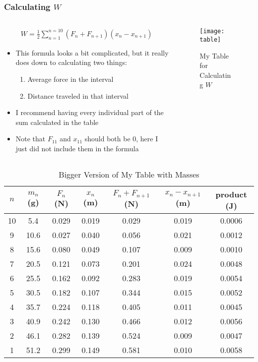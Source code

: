 \documentclass[handout,aspectratio=169]{beamer}
\begin{document}
\begin{frame}
  \frametitle{Calculating $W$}
  \begin{columns}
    \begin{column}{0.6\textwidth}
      {\footnotesize \begin{align*}
        W=\frac12\sum_{n=1}^{n=10}(F_n+F_{n+1})(x_n-x_{n+1})
      \end{align*}}
      \begin{itemize}
      \item This formula looks a bit complicated, but it really does down to calculating two things:
        \begin{enumerate}
        \item Average force in the interval
        \item Distance traveled in that interval
        \end{enumerate}
      \item I recommend having every individual part of the sum calculated in the table 
      \item Note that $F_{11}$ and $x_{11}$ should both be 0, here I just did not include them in the formula
      \end{itemize}
    \end{column}
    \begin{column}{0.4\textwidth}
      \begin{figure}[H]
        \centering
        \texttt{[image: table]}
        \caption{My Table for Calculating $W$}
      \end{figure}
    \end{column}
  \end{columns}
\end{frame}
\begin{frame}
  \begin{table}[H]
    \begin{tabular}{c|c|c|c|c|c|c}
      $n$ & $m_n$ (g) & $F_n$ (N) & $x_n$ (m) & $F_n+F_{n+1}$ (N) & $x_n-x_{n+1}$ (m) & product (J) \\ \hline
      10 & 5.4  & 0.029 & 0.019 & 0.029 & 0.019 & 0.0006 \\
      9  & 10.6 & 0.027 & 0.040 & 0.056 & 0.021 & 0.0012 \\
      8  & 15.6 & 0.080 & 0.049 & 0.107 & 0.009 & 0.0010 \\
      7  & 20.5 & 0.121 & 0.073 & 0.201 & 0.024 & 0.0048 \\
      6  & 25.5 & 0.162 & 0.092 & 0.283 & 0.019 & 0.0054 \\
      5  & 30.5 & 0.182 & 0.107 & 0.344 & 0.015 & 0.0052 \\
      4  & 35.7 & 0.224 & 0.118 & 0.405 & 0.011 & 0.0045 \\
      3  & 40.9 & 0.242 & 0.130 & 0.466 & 0.012 & 0.0056 \\
      2  & 46.1 & 0.282 & 0.139 & 0.524 & 0.009 & 0.0047 \\
      1  & 51.2 & 0.299 & 0.149 & 0.581 & 0.010 & 0.0058
    \end{tabular}
    \caption{Bigger Version of My Table with Masses}
  \end{table}
\end{frame}
\end{document}
